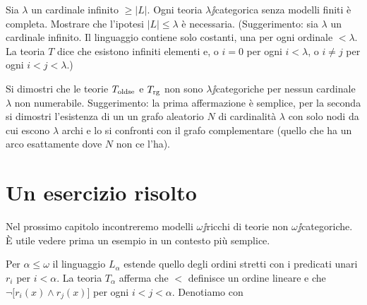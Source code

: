 \begin{exercise}\label{categorica->completa}
Sia $\lambda$ un cardinale infinito $\ge|L|$. Ogni teoria $\lambda\jj$categorica senza modelli finiti \`e completa. Mostrare che l'ipotesi $|L|\le\lambda$ \`e necessaria. (Suggerimento: sia $\lambda$ un cardinale infinito. Il linguaggio contiene solo costanti, una per ogni ordinale $<\lambda$. La teoria $T$ dice che esistono infiniti elementi e, o $i=0$ per ogni $i<\lambda$, o $i\neq j$ per ogni $i<j<\lambda$.)\QED
\end{exercise}

\begin{exercise}
Si dimostri che le teorie $T_{\rm oldse}$  e $T_{\rm rg}$ non sono $\lambda\jj$categoriche per nessun cardinale $\lambda$ non numerabile. Suggerimento: la prima affermazione \`e semplice, per la seconda si dimostri l'esistenza di un un grafo aleatorio $N$ di cardinalit\`a $\lambda$ con solo nodi da cui escono $\lambda$ archi e lo si confronti con il grafo complementare (quello che ha un arco esattamente dove $N$ non ce l'ha).\QED
\end{exercise}

\section{Un esercizio risolto}\label{eserciziorisolto}

Nel prossimo capitolo incontreremo modelli $\omega\jj$ricchi di teorie non $\omega\jj$categoriche. \`E utile vedere prima un esempio in un contesto pi\`u semplice.

Per $\alpha\le\omega$ il linguaggio $L_\alpha$ estende quello degli ordini stretti con i predicati unari $r_i$ per $i<\alpha$. La teoria  $T_\alpha$ afferma che $<$ definisce un ordine lineare e che $\neg \big[r_i(x)\wedge r_j(x)\big]$ per ogni $i<j<\alpha$. Denotiamo con 


